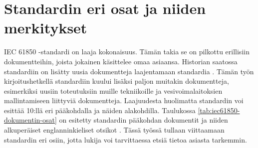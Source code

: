 \section{Standardin eri osat ja niiden merkitykset}	
IEC 61850 -standardi on laaja kokonaisuus. Tämän takia se on pilkottu erillisiin dokumentteihin, joista jokainen käsittelee omaa asiaansa. Historian saatossa standardiin on lisätty uusia dokumentteja laajentamaan standardia \mbox{\cite{IEC61850series, New-documents-by-IEC-TC-57}} \mbox{\cite[s.~13]{IEC61850-1}}. Tämän työn kirjoitushetkellä standardiin kuului lisäksi paljon muitakin dokumentteja, esimerkiksi uusiin toteutuksiin muille tekniikoille ja vesivoimalaitoksien mallintamiseen liittyviä dokumentteja. Laajuudesta huolimatta standardin voi esittää 10:llä eri pääkohdalla ja näiden alakohdilla. Taulukossa \ref{tab:iec61850-dokumentin-osat} on esitetty standardin pääkohdan dokumentit ja niiden alkuperäiset englanninkieliset otsikot \mbox{\cite{IEC61850series}}. Tässä työssä tullaan viittaamaan standardin eri osiin, jotta lukija voi tarvittaessa etsiä tietoa asiasta tarkemmin.


